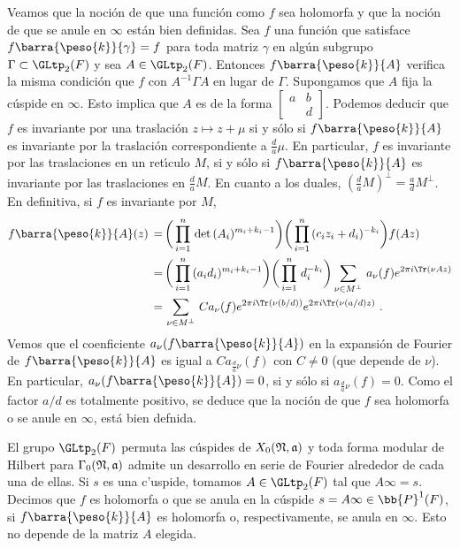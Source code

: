 Veamos que la noci\'{o}n de que una funci\'{o}n como $f$ sea holomorfa y
que la noci\'{o}n de que se anule en $\infty$ est\'{a}n bien definidas.
Sea $f$ una funci\'{o}n que
satisface $f\barra{\peso{k}}{\gamma}=f$ para toda matriz $\gamma$ en alg\'{u}n
subgrupo $\Gamma\subset\GLtp_{2}(F)$ y sea $A\in\GLtp_{2}(F)$.
Entonces $f\barra{\peso{k}}{A}$ verifica la misma condici\'{o}n que $f$ con
$A^{-1}\Gamma A$ en lugar de $\Gamma$. Supongamos que $A$ fija la
c\'{u}spide en $\infty$. Esto implica que $A$ es de la forma
$\begin{bmatrix} a & b \\ & d \end{bmatrix}$. Podemos deducir que $f$ es
invariante por una traslaci\'{o}n $z\mapsto z + \mu$ si y s\'{o}lo si
$f\barra{\peso{k}}{A}$ es invariante por la traslaci\'{o}n correspondiente
a $\frac{d}{a}\mu$. En particular, $f$ es invariante por las traslaciones
en un ret\'{\i}culo $M$, si y s\'{o}lo si $f\barra{\peso{k}}{A}$ es
invariante por las traslaciones en $\frac{d}{a}M$. En cuanto a los duales,
$\left(\frac{d}{a}M\right)^{\perp}=\frac{a}{d}M^{\perp}$. En definitiva,
si $f$ es invariante por $M$,
\begin{align*}
	f\barra{\peso{k}}{A}(z) \,=\, &
	\bigg(\prod_{i=1}^{n}\,\det\,(A_{i})^{m_{i}+k_{i}-1}\bigg)
	\bigg(\prod_{i=1}^{n}\,(c_{i}z_{i}+d_{i})^{-k_{i}}\bigg)
	f(Az) \\
	\,=\, &
	\bigg(\prod_{i=1}^{n}\,(a_{i}d_{i})^{m_{i}+k_{i}-1}\bigg)
	\bigg(\prod_{i=1}^{n}\,d_{i}^{-k_{i}}\bigg)
	\sum_{\nu\in M^{\perp}}\,a_{\nu}(f)
	e^{2\pi i\Tr(\nu Az)} \\
	\,=\, & \sum_{\nu\in M^{\perp}}\,Ca_{\nu}(f)
	e^{2\pi i\Tr(\nu(b/d))}e^{2\pi i\Tr(\nu(a/d)z)}
	\text{ .}
\end{align*}
%
Vemos que el coenficiente  $a_{\nu}(f\barra{\peso{k}}{A})$ en la
expansi\'{o}n de Fourier de $f\barra{\peso{k}}{A}$ es igual a
$Ca_{\frac{d}{a}\nu}(f)$ con $C\not = 0$ (que depende de $\nu$). En
particular, $a_{\nu}(f\barra{\peso{k}}{A})=0$, si y s\'{o}lo si
$a_{\frac{d}{a}\nu}(f)=0$. Como el factor $a/d$ es totalmente positivo, se
deduce que la noci\'{o}n de que $f$ sea holomorfa o se anule en
$\infty$, est\'{a} bien defnida.

El grupo $\GLtp_{2}(F)$ permuta las c\'{u}spides de
$X_{0}(\frak{N},\frak{a})$ y toda forma modular de Hilbert para
$\Gamma_{0}(\frak{N},\frak{a})$ admite un desarrollo en serie de Fourier
alrededor de cada una de ellas. Si $s$ es una c'{u}spide,
tomamos $A\in\GLtp_{2}(F)$ tal que $A\infty=s$. Decimos que $f$ es
holomorfa o que se anula en la c\'{u}spide $s=A\infty\in\bb{P}^{1}(F)$,
si $f\barra{\peso{k}}{A}$ es holomorfa o, respectivamente, se anula en
$\infty$. Esto no depende de la matriz $A$ elegida.

